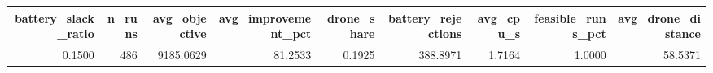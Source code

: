 \begin{tabular}{rrrrrrrrr}
\toprule
battery_slack_ratio & n_runs & avg_objective & avg_improvement_pct & drone_share & battery_rejections & avg_cpu_s & feasible_runs_pct & avg_drone_distance \\
\midrule
0.1500 & 486 & 9185.0629 & 81.2533 & 0.1925 & 388.8971 & 1.7164 & 1.0000 & 58.5371 \\
\bottomrule
\end{tabular}
